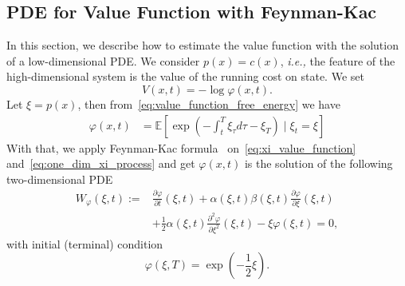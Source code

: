 \documentclass[letterpaper]{article} %
\newcommand{\ie}{\textit{i.e., }}
\begin{document}
\subsection{PDE for Value Function with Feynman-Kac}
\label{sec:Feynman_Kac_PDE}
In this section, we describe how to estimate the value function with the solution of a low-dimensional PDE.
We consider $p(x) = c(x)$, \ie the feature of the high-dimensional system is the value of the running cost on state.
We set
\begin{equation}
\label{eq:V_exp_transformation}
    V(x, t)=-\log \varphi(x, t).
\end{equation}
Let $\xi = p(x)$, then from~\eqref{eq:value_function_free_energy} we have
\begin{equation}
\label{eq:xi_value_function}
\begin{aligned}
    \varphi(x, t) %
    & = \mathbb{E} \left[\exp \left(-\int_t^T \xi_\tau d \tau - \xi_T\right)  \mid \xi_t=\xi\right]
\end{aligned}
\end{equation}
With that, we apply Feynman-Kac formula~\cite{del2004feynman} on~\eqref{eq:xi_value_function} and~\eqref{eq:one_dim_xi_process} and get $\varphi(x, t)$ is the solution of the following two-dimensional PDE
\begin{equation}
\label{eq:one_dim_PDE}
\begin{aligned}
    W_{\varphi}(\xi,t) := & \frac{\partial \varphi}{\partial t}(\xi, t) + \alpha(\xi, t)\beta(\xi, t)\frac{\partial \varphi}{\partial \xi}(\xi, t) \\
    & +\frac{1}{2} \alpha(\xi, t) \frac{\partial^2 \varphi}{\partial \xi^2}(\xi, t) - \xi \varphi(\xi, t)=0,
\end{aligned}
\end{equation}
with initial (terminal) condition
\begin{equation}
\label{eq:one_dim_PDE_ic}
    \varphi(\xi, T) = \exp(-\frac{1}{2}\xi).
\end{equation}
\end{document}
